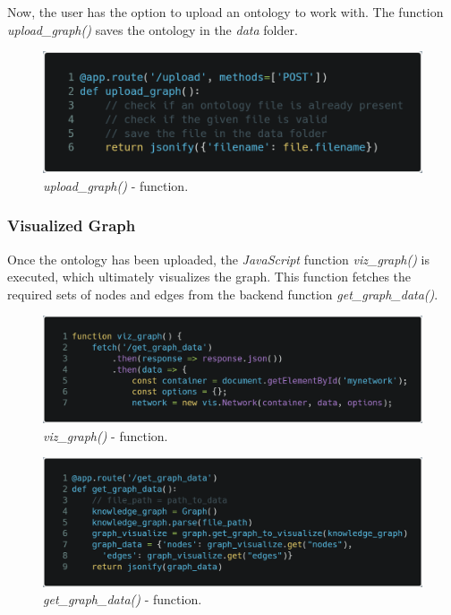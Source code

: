Now, the user has the option to upload an ontology to work with. The function \textit{upload\_graph()} saves the ontology in the \textit{data} folder.

\begin{figure}[H]
    \includegraphics[scale=0.2]{Graphics/upload_graph.png}
    \caption{\textit{upload\_graph()} - function.}
\end{figure}

\subsubsection{Visualized Graph}
Once the ontology has been uploaded, the \textit{JavaScript} function \textit{viz\_graph()} is executed, 
which ultimately visualizes the graph. This function fetches the required sets of nodes and edges from the backend function \textit{get\_graph\_data()}.

\begin{figure}[H]
    \includegraphics[scale=0.2]{Graphics/viz_graph_function().png}
    \caption{\textit{viz\_graph()} - function.}

\end{figure}

\begin{figure}[H]
    \includegraphics[scale=0.2]{Graphics/get_graph_data.png}
    \caption{\textit{get\_graph\_data()} - function.}

\end{figure}

